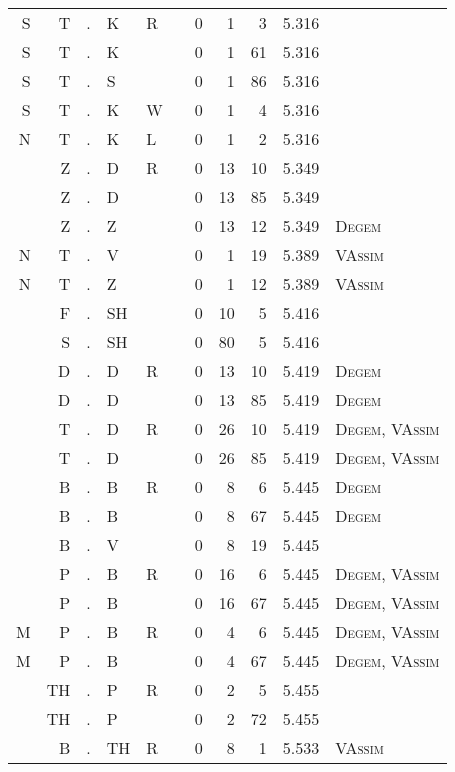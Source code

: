 \begin{longtable}{r@{ } r@{ } c@{ } l@{ } l@{ } l@{ } r r r r l }
S & T & . & K & R &   & 0 & 1 & 3 & 5.316 &  \\
S & T & . & K &   &   & 0 & 1 & 61 & 5.316 &  \\
S & T & . & S &   &   & 0 & 1 & 86 & 5.316 &  \\
S & T & . & K & W &   & 0 & 1 & 4 & 5.316 &  \\
N & T & . & K & L &   & 0 & 1 & 2 & 5.316 &  \\
  & Z & . & D & R &   & 0 & 13 & 10 & 5.349 &  \\
  & Z & . & D &   &   & 0 & 13 & 85 & 5.349 &  \\
  & Z & . & Z &   &   & 0 & 13 & 12 & 5.349 & \textsc{Degem} \\
N & T & . & V &   &   & 0 & 1 & 19 & 5.389 & \textsc{VAssim} \\
N & T & . & Z &   &   & 0 & 1 & 12 & 5.389 & \textsc{VAssim} \\
  & F & . & SH &   &   & 0 & 10 & 5 & 5.416 &  \\
  & S & . & SH &   &   & 0 & 80 & 5 & 5.416 &  \\
  & D & . & D & R &   & 0 & 13 & 10 & 5.419 & \textsc{Degem} \\
  & D & . & D &   &   & 0 & 13 & 85 & 5.419 & \textsc{Degem} \\
  & T & . & D & R &   & 0 & 26 & 10 & 5.419 & \textsc{Degem}, \textsc{VAssim} \\
  & T & . & D &   &   & 0 & 26 & 85 & 5.419 & \textsc{Degem}, \textsc{VAssim} \\
  & B & . & B & R &   & 0 & 8 & 6 & 5.445 & \textsc{Degem} \\
  & B & . & B &   &   & 0 & 8 & 67 & 5.445 & \textsc{Degem} \\
  & B & . & V &   &   & 0 & 8 & 19 & 5.445 &  \\
  & P & . & B & R &   & 0 & 16 & 6 & 5.445 & \textsc{Degem}, \textsc{VAssim} \\
  & P & . & B &   &   & 0 & 16 & 67 & 5.445 & \textsc{Degem}, \textsc{VAssim} \\
M & P & . & B & R &   & 0 & 4 & 6 & 5.445 & \textsc{Degem}, \textsc{VAssim} \\
M & P & . & B &   &   & 0 & 4 & 67 & 5.445 & \textsc{Degem}, \textsc{VAssim} \\
  & TH & . & P & R &   & 0 & 2 & 5 & 5.455 &  \\
  & TH & . & P &   &   & 0 & 2 & 72 & 5.455 &  \\
  & B & . & TH & R &   & 0 & 8 & 1 & 5.533 & \textsc{VAssim} \\

\end{longtable}
